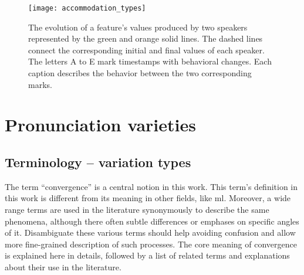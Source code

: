 \begin{figure}[t]
	\centering
	\texttt{[image: accommodation\_types]}
	\caption[Different accommodation types in a conversation]
		{The evolution of a feature's values produced by two speakers represented by the green and orange solid lines.
		The dashed lines connect the corresponding initial and final values of each speaker.
		The letters A to E mark timestamps with behavioral changes.
		Each caption describes the behavior between the two corresponding marks.}
	\label{fig:accommodation_types}
\end{figure}

\section{Pronunciation varieties}
\label{sec:pronunciation_varieties}


\subsection{Terminology -- variation types}
\label{subsec:variation_types}

The term \enquote{convergence} is a central notion in this work.
This term's definition in this work is different from its meaning in other fields, like \ac{ml}.
Moreover, a wide range terms are used in the literature synonymously to describe the same phenomena, although there often subtle differences or emphases on specific angles of it.
Disambiguate these various terms should help avoiding confusion and allow more fine-grained description of such processes.
The core meaning of convergence is explained here in details, followed by a list of related terms and explanations about their use in the literature.

